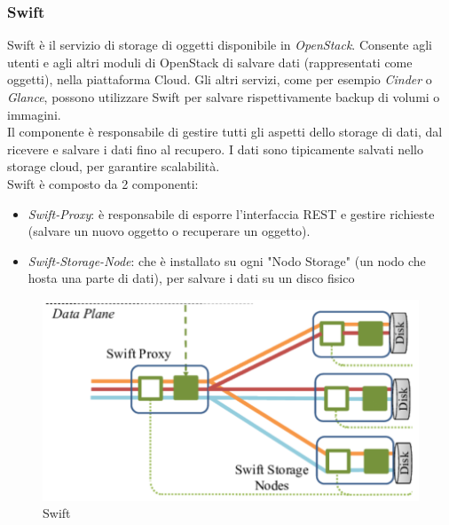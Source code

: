 \documentclass{article}
\begin{document}
\subsubsection{Swift}
Swift è il servizio di storage di oggetti disponibile in \textit{OpenStack}. Consente agli utenti e agli altri moduli di OpenStack di salvare dati (rappresentati come oggetti), nella piattaforma Cloud. Gli altri servizi, come per esempio \textit{Cinder} o \textit{Glance}, possono utilizzare Swift per salvare rispettivamente backup di volumi o immagini. \\
Il componente è responsabile di gestire tutti gli aspetti dello storage di dati, dal ricevere e salvare i dati fino al recupero. I dati sono tipicamente salvati nello storage cloud, per garantire scalabilità. \\
Swift è composto da 2 componenti:
\begin{itemize}
    \item \textit{Swift-Proxy}: è responsabile di esporre l'interfaccia REST e gestire richieste (salvare un nuovo oggetto o recuperare un oggetto).
    \item \textit{Swift-Storage-Node}: che è installato su ogni "Nodo Storage" (un nodo che hosta una parte di dati), per salvare i dati su un disco fisico
\end{itemize}
\begin{figure}[H]
    \centering
    \includegraphics[scale=0.5]{img/swift.png}
    \caption{Swift}
\end{figure}\noindent
\end{document}
